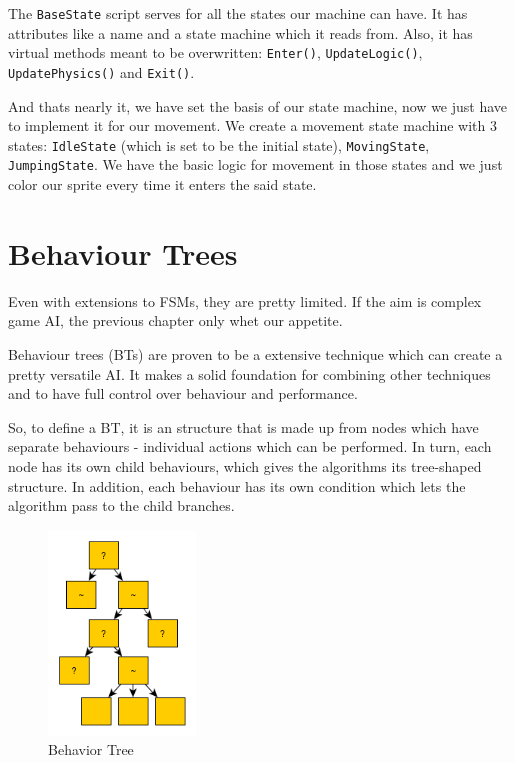 \documentclass[a4paper, 12pt]{book}
\begin{document}
The \texttt{BaseState} script serves for all the states our machine can have. It has attributes like a name and a state machine which it reads from. Also, it has virtual methods meant to be overwritten: \texttt{Enter()}, \texttt{UpdateLogic()}, \texttt{UpdatePhysics()} and \texttt{Exit()}.

And thats nearly it, we have set the basis of our state machine, now we just have to implement it for our movement. We create a movement state machine with 3 states: \texttt{IdleState} (which is set to be the initial state), \texttt{MovingState}, \texttt{JumpingState}. We have the basic logic for movement in those states and we just color our sprite every time it enters the said state.

\clearpage

\section{Behaviour Trees}

Even with extensions to FSMs, they are pretty limited. If the aim is complex game AI, the previous chapter only whet our appetite.

Behaviour trees (BTs) \cite{BehaviourTreeStarterPack} are proven to be a extensive technique which can create a pretty versatile AI. It makes a solid foundation for combining other techniques and to have full control over behaviour and performance.

So, to define a BT, it is an structure that is made up from nodes which have separate behaviours - individual actions which can be performed. In turn, each node has its own child behaviours, which gives the algorithms its tree-shaped structure. In addition, each behaviour has its own condition which lets the algorithm pass to the child branches.

\begin{figure}[h]
\begin{center}
    \includegraphics[width=0.35\textwidth]{Images/behaviour_tree.png}
\end{center}
\caption{Behavior Tree \cite{behaviourTreeBlog}}
\label{pic3}
\end{figure}
\end{document}
